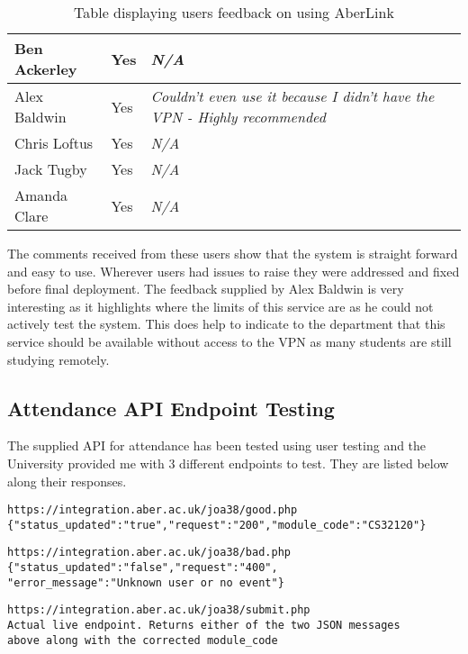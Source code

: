 \begin{table}[H]
\begin{tabular}{|p{2cm}|p{2cm}|p{10cm}|}
        \hline
        Ben Ackerley & \color{ForestGreen}Yes & \textit{N/A} \\
        \hline
        Alex Baldwin & \color{ForestGreen}Yes & \textit{Couldn't even use it because I didn't have the VPN - Highly recommended} \\
        \hline
        Chris Loftus & \color{ForestGreen}Yes & \textit{N/A} \\
        \hline
        Jack Tugby & \color{ForestGreen}Yes & \textit{N/A} \\
        \hline
        Amanda Clare & \color{ForestGreen}Yes & \textit{N/A} \\
        \hline
    \end{tabular}
    \caption{Table displaying users feedback on using AberLink}
    \label{tab:service-response}
\end{table}

The comments received from these users show that the system is straight forward and easy to use. Wherever users had issues to raise they were addressed and fixed before final deployment. The feedback supplied by Alex Baldwin is very interesting as it highlights where the limits of this service are as he could not actively test the system. This does help to indicate to the department that this service should be available without access to the VPN as many students are still studying remotely.

\subsection{Attendance API Endpoint Testing}
The supplied API for attendance has been tested using user testing and the University provided me with 3 different endpoints to test. They are listed below along their responses.

\begin{verbatim}
https://integration.aber.ac.uk/joa38/good.php
{"status_updated":"true","request":"200","module_code":"CS32120"}    
\end{verbatim}

\begin{verbatim}
https://integration.aber.ac.uk/joa38/bad.php
{"status_updated":"false","request":"400",
"error_message":"Unknown user or no event"}
\end{verbatim}

\begin{verbatim}
https://integration.aber.ac.uk/joa38/submit.php
Actual live endpoint. Returns either of the two JSON messages 
above along with the corrected module_code
\end{verbatim}

